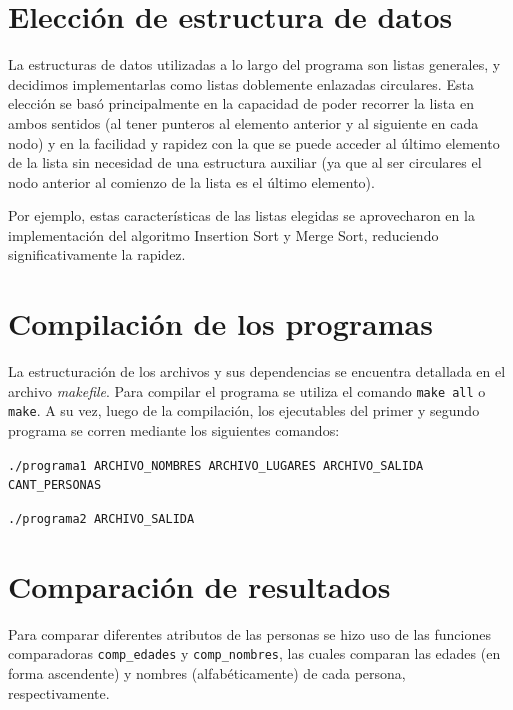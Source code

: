 \documentclass[11pt]{article}
\begin{document}
\section{Elección de estructura de datos}

La estructuras de datos utilizadas a lo largo del programa son listas generales, y decidimos implementarlas como listas doblemente enlazadas circulares. Esta elección se basó principalmente en la capacidad de poder recorrer la lista en ambos sentidos (al tener punteros al elemento anterior y al siguiente en cada nodo) y en la facilidad y rapidez con la que se puede acceder al último elemento de la lista sin necesidad de una estructura auxiliar (ya que al ser circulares el nodo anterior al comienzo de la lista es el último elemento).\par

Por ejemplo, estas características de las listas elegidas se aprovecharon en la implementación del algoritmo Insertion Sort y Merge Sort, reduciendo significativamente la rapidez.\par

\section{Compilación de los programas}

La estructuración de los archivos y sus dependencias se encuentra detallada en el archivo \textit{makefile}. Para compilar el programa se utiliza el comando \verb|make all| o \verb|make|. A su vez, luego de la compilación, los ejecutables del primer y segundo programa se corren mediante los siguientes comandos:\par

\noindent \verb|./programa1 ARCHIVO_NOMBRES ARCHIVO_LUGARES ARCHIVO_SALIDA CANT_PERSONAS| \par
\noindent \verb|./programa2 ARCHIVO_SALIDA|\par


\section{Comparación de resultados}

Para comparar diferentes atributos de las personas se hizo uso de las funciones comparadoras \verb|comp_edades| y \verb|comp_nombres|, las cuales comparan las edades (en forma ascendente) y nombres (alfabéticamente) de cada persona, respectivamente.\par
\end{document}
